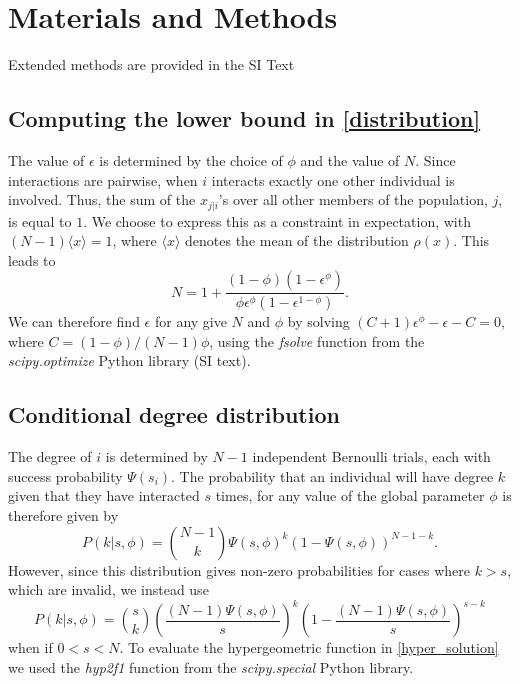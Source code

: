 \documentclass[twocolumn,8pt]{article}
\begin{document}
\scriptsize
\section*{Materials and Methods}
Extended methods are provided in the SI Text
\renewcommand\thesubsection{\Alph{subsection}.}
\subsection{Computing the lower bound in \eqref{distribution}}
\label{lower_bound}
The value of $\epsilon$ is determined by the choice of $\phi$ and the value of $N$. Since interactions are pairwise, when $i$ interacts exactly one other individual is involved. Thus, the sum of the $x_{j|i}$'s over all other members of the population, $j$, is equal to $1$. We choose to express this as a constraint in expectation, with $(N-1)\langle x \rangle=1$,
where $\langle x \rangle$ denotes the mean of the distribution $\rho(x)$. This leads to 
\begin{equation}
\label{x_mean}
N=1+\frac{(1-\phi)(1-\epsilon^{\phi})}{\phi\epsilon^{\phi}(1-\epsilon^{1-\phi})}.
\end{equation}
We can therefore find $\epsilon$ for any give $N$ and $\phi$ by solving $(C+1)\epsilon^{\phi}-\epsilon-C=0$,
where $C=(1-\phi)/(N-1)\phi$, using the \emph{fsolve} function from the \emph{scipy.optimize} Python library (SI text). 

\subsection{Conditional degree distribution} 
\label{degree_dist}
The degree of $i$ is determined by $N-1$ independent Bernoulli trials, each with success probability $\Psi(s_{i})$. The probability that an individual will have degree $k$ given that they have interacted $s$ times, for any value of the global parameter $\phi$ is therefore given by
\begin{equation}
 P(k|s,\phi)=\binom{N-1}{k}\Psi(s,\phi)^{k}\left(1-\Psi(s,\phi)\right)^{N-1-k}.
\end{equation}
However, since this distribution gives non-zero probabilities for cases where $k>s$, which are invalid, we instead use
\begin{equation}
P(k|s,\phi)=\binom{s}{k}\left(\frac{(N-1)\Psi(s,\phi)}{s}\right)^{k}\left(1-\frac{(N-1)\Psi(s,\phi)}{s}\right)^{s-k}
\end{equation}
when if $0<s<N$. To evaluate the hypergeometric function in \eqref{hyper_solution} we used the \emph{hyp2f1} function  from the \emph{scipy.special} Python library.
\end{document}
